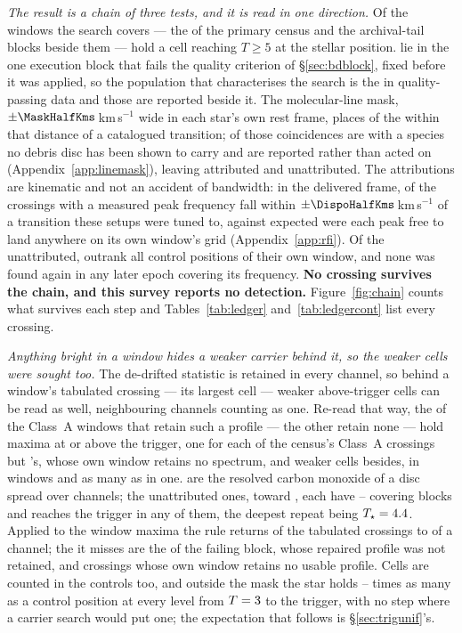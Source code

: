 \emph{The result is a chain of three tests, and it is read in one direction.}
Of the windows the search covers --- the \NWindows{} of the primary census
and the archival-tail blocks beside them --- \EvNCrossRaw{} hold a cell
reaching $T\geq5$ at the stellar position. \EvNCrossFlag{} lie in the one
execution block that fails the quality criterion of \S\ref{sec:bdblock}, fixed
before it was applied, so the population that characterises the search is the
\EvNCrossQp{} in quality-passing data and those \EvNCrossFlag{} are reported
beside it. The molecular-line mask, $\pm\MaskHalfKms$\,km\,s$^{-1}$ wide in
each star's own rest frame, places \MkNCoinc{} of the \EvNCrossQp{} within
that distance of a catalogued transition; \MkNSODecideWord{} of those
coincidences are with a species no debris disc has been shown to carry and are
reported rather than acted on (Appendix~\ref{app:linemask}), leaving
\EvNAttrQp{} attributed and \EvNUnattrQp{} unattributed. The attributions are
kinematic and not an accident of bandwidth: in the delivered frame,
\AppMTubeObs{} of the
\AppMNCrossF{} crossings with a measured peak frequency fall within
$\pm\DispoHalfKms$\,km\,s$^{-1}$ of a transition these setups were tuned to, against
\AppMTubeNull{} expected were each peak free to land anywhere on its own
window's grid (Appendix~\ref{app:rfi}). Of the unattributed,
\EvNRankQp{} outrank all \NCtrl{} control positions of their own window, and
none was found again in any later epoch covering its frequency. \textbf{No
crossing survives the chain, and this survey reports no detection.}
Figure~\ref{fig:chain} counts what survives each step and
Tables~\ref{tab:ledger} and~\ref{tab:ledgercont} list every crossing.

\emph{Anything bright in a window hides a weaker carrier behind it, so the
weaker cells were sought too.} The de-drifted statistic is retained in every
channel, so behind a window's tabulated crossing --- its largest cell ---
weaker above-trigger cells can be read as well, neighbouring channels counting
as one. Re-read that way, the
\CkNWin{} of the \NWinA{} Class~A windows that retain such a profile --- the
other \CkNWinNotCov{} retain none --- hold \CkNPrimary{} maxima at or above
the trigger, one for each of the census's \CkNCrossCenA{} Class~A crossings
but \CkMissStar's, whose own window retains no spectrum, and
\CkNSecondaryWord{} weaker cells besides,
in \CkNSecWin{} windows and as many as
\CkNSecMax{} in one. \CkNSecAttr{} are the resolved carbon monoxide of a disc
spread over channels; the \CkNSecUnattrWord{} unattributed ones, toward
\CkSecStars, each have \CkCovLo--\CkCovHi{} covering blocks and
\CkNRecurWord{} reaches the trigger in any of them, the deepest repeat being
$T_\star=4.4$. Applied to the window maxima the
rule returns \CkRegN{} of the \EvNCrossRaw{} tabulated crossings to
\CkRegDev{} of a channel; the \CkRegMiss{} it misses are the \EvNCrossFlag{}
of the failing block, whose repaired profile was not retained, and crossings
whose own window retains no usable profile.
Cells are counted in the controls too, and outside the mask the star holds
\CkRatioLo--\CkRatioHi{} times as many as a control position at every level
from $T=3$ to the trigger, with no step where a carrier search would
put one; the expectation that follows is \S\ref{sec:trigunif}'s.

